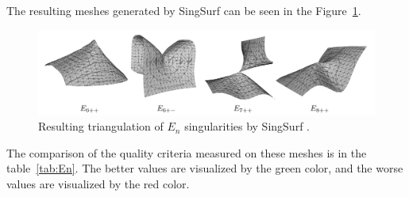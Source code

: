     The resulting meshes generated by SingSurf 
can be seen in the Figure~\ref{img:70}.
\begin{figure}[h!]
    \centerline{\includegraphics[scale=0.5]{images/img70}}
    \caption[Resulting triangulation of $E_{n}$ singularities by SingSurf]
    {Resulting triangulation of $E_{n}$ singularities by SingSurf \cite{morris2003client}.}
    \label{img:70}
\end{figure}

The comparison of the quality criteria measured on these meshes 
is in the table~\ref{tab:En}. The better values are visualized
by the green color, and the worse values are visualized by the red 
color.

